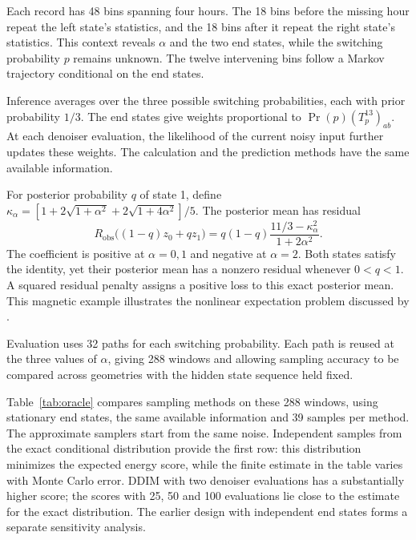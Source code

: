 \documentclass{article}
\begin{document}
Each record has 48 bins spanning four hours. The 18 bins before the missing hour repeat the left state's statistics, and the 18 bins after it repeat the right state's statistics. This context reveals $\alpha$ and the two end states, while the switching probability $p$ remains unknown. The twelve intervening bins follow a Markov trajectory conditional on the end states.

Inference averages over the three possible switching probabilities, each with prior probability $1/3$. The end states give weights proportional to $\Pr(p)(T_p^{13})_{ab}$. At each denoiser evaluation, the likelihood of the current noisy input further updates these weights. The calculation and the prediction methods have the same available information.

For posterior probability $q$ of state 1, define $\kappa_\alpha=[1+2\sqrt{1+\alpha^2}+2\sqrt{1+4\alpha^2}]/5$. The posterior mean has residual
\begin{equation}
 R_{\mathrm{obs}}\bigl((1-q)z_0+qz_1\bigr)
 =q(1-q)\frac{11/3-\kappa_\alpha^2}{1+2\alpha^2}.
 \label{eq:toymean}
\end{equation}
The coefficient is positive at $\alpha=0,1$ and negative at $\alpha=2$. Both states satisfy the identity, yet their posterior mean has a nonzero residual whenever $0<q<1$. A squared residual penalty assigns a positive loss to this exact posterior mean. This magnetic example illustrates the nonlinear expectation problem discussed by \citet{bastek2025pidm}.

Evaluation uses 32 paths for each switching probability. Each path is reused at the three values of $\alpha$, giving 288 windows and allowing sampling accuracy to be compared across geometries with the hidden state sequence held fixed.

Table~\ref{tab:oracle} compares sampling methods on these 288 windows, using stationary end states, the same available information and 39 samples per method. The approximate samplers start from the same noise. Independent samples from the exact conditional distribution provide the first row: this distribution minimizes the expected energy score, while the finite estimate in the table varies with Monte Carlo error. DDIM with two denoiser evaluations has a substantially higher score; the scores with 25, 50 and 100 evaluations lie close to the estimate for the exact distribution. The earlier design with independent end states forms a separate sensitivity analysis.
\end{document}
